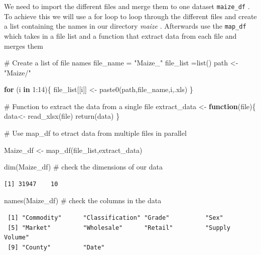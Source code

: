 \documentclass[
  letterpaper,
  DIV=11,
  numbers=noendperiod]{scrartcl}
\newenvironment{Shaded}{\begin{snugshade}}{\end{snugshade}}
\newcommand{\CommentTok}[1]{\textcolor[rgb]{0.37,0.37,0.37}{#1}}
\newcommand{\ControlFlowTok}[1]{\textcolor[rgb]{0.00,0.23,0.31}{\textbf{#1}}}
\newcommand{\DecValTok}[1]{\textcolor[rgb]{0.68,0.00,0.00}{#1}}
\newcommand{\FunctionTok}[1]{\textcolor[rgb]{0.28,0.35,0.67}{#1}}
\newcommand{\NormalTok}[1]{\textcolor[rgb]{0.00,0.23,0.31}{#1}}
\newcommand{\OtherTok}[1]{\textcolor[rgb]{0.00,0.23,0.31}{#1}}
\newcommand{\SpecialCharTok}[1]{\textcolor[rgb]{0.37,0.37,0.37}{#1}}
\newcommand{\StringTok}[1]{\textcolor[rgb]{0.13,0.47,0.30}{#1}}
\begin{document}
We need to import the different files and merge them to one dataset
\texttt{maize\_df} . To achieve this we will use a for loop to loop
through the different files and create a list containing the names in
our directory \emph{maize} . Afterwards use the \texttt{map\_df} which
takes in a file list and a function that extract data from each file and
merges them

\begin{Shaded}
\begin{Highlighting}[]
\CommentTok{\# Create a list of file names}
\NormalTok{file\_name }\OtherTok{=} \StringTok{"Maize\_"}
\NormalTok{file\_list }\OtherTok{=}\FunctionTok{list}\NormalTok{()}
\NormalTok{path }\OtherTok{\textless{}{-}} \StringTok{"Maize/"}

\ControlFlowTok{for}\NormalTok{ (i }\ControlFlowTok{in} \DecValTok{1}\SpecialCharTok{:}\DecValTok{14}\NormalTok{)\{}
\NormalTok{  file\_list[[i]] }\OtherTok{\textless{}{-}} \FunctionTok{paste0}\NormalTok{(path,file\_name,i,}\StringTok{\textquotesingle{}.xls\textquotesingle{}}\NormalTok{)}
\NormalTok{\}}

\CommentTok{\# Function to extract the data from a single file}
\NormalTok{extract\_data }\OtherTok{\textless{}{-}} \ControlFlowTok{function}\NormalTok{(file)\{}
\NormalTok{  data}\OtherTok{\textless{}{-}} \FunctionTok{read\_xlsx}\NormalTok{(file)}
  \FunctionTok{return}\NormalTok{(data)}
\NormalTok{\}}

\CommentTok{\# Use map\_df to etract data from multiple files in parallel }

\NormalTok{Maize\_df }\OtherTok{\textless{}{-}} \FunctionTok{map\_df}\NormalTok{(file\_list,extract\_data)}

\FunctionTok{dim}\NormalTok{(Maize\_df) }\CommentTok{\# check the dimensions of our data}
\end{Highlighting}
\end{Shaded}

\begin{verbatim}
[1] 31947    10
\end{verbatim}

\begin{Shaded}
\begin{Highlighting}[]
\FunctionTok{names}\NormalTok{(Maize\_df) }\CommentTok{\# check the columns in the data}
\end{Highlighting}
\end{Shaded}

\begin{verbatim}
 [1] "Commodity"      "Classification" "Grade"          "Sex"           
 [5] "Market"         "Wholesale"      "Retail"         "Supply Volume" 
 [9] "County"         "Date"          
\end{verbatim}
\end{document}
